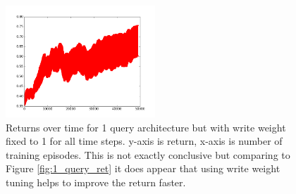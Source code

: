 \documentclass{article}
\begin{document}
\begin{figure}[!ht]
\center
\includegraphics[width=0.5\textwidth]{images/1_query_mem_ret_no_write.png}
\caption{Returns over time for 1 query architecture but with write weight fixed to 1 for all time steps. y-axis is return, x-axis is number of training episodes. This is not exactly conclusive but comparing to Figure \ref{fig:1_query_ret} it does appear that using write weight tuning helps to improve the return faster.}
\label{fig:1_query_no_write}
\end{figure}
\end{document}
